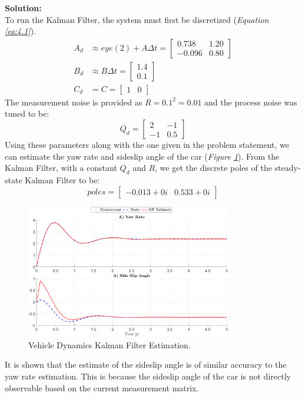 \documentclass[10pt]{article}
\newcommand{\solution}{\textbf{Solution: \\}}
\begin{document}
\begin{enumerate}[label=\textbf{\arabic*.}]
  \solution
  To run the Kalman Filter, the system must first be discretized 
  (\emph{Equation \ref{eq:4.1}}).
  \begin{equation}
    \begin{split}
      A_d &\approx eye(2) + A \Delta t = 
      \begin{bmatrix}
        0.738 & 1.20 \\ -0.096 & 0.80
      \end{bmatrix} \\
      B_d &\approx B \Delta t = 
      \begin{bmatrix}
        1.4 \\ 0.1
      \end{bmatrix} \\
      C_d &= C = 
      \begin{bmatrix}
        1 & 0
      \end{bmatrix}
    \end{split}
    \label{eq:4.1}
  \end{equation}
  The measurement noise is provided as $R=0.1^2=0.01$ and the process noise was 
  tuned to be:
  \begin{equation*}
    Q_d = \begin{bmatrix} 2 & -1 \\ -1 & 0.5 \end{bmatrix}
  \end{equation*}
  Using these parameters along with the one given in the problem statement, we 
  can estimate the yaw rate and sideslip angle of the car 
  (\emph{Figure \ref{f:4.1}}). From the Kalman Filter, with a constant 
  $Q_d$ and $R$, we get the discrete poles of the steady-state Kalman Filter to 
  be:
  \begin{equation*}
    poles = 
    \begin{bmatrix}
      -0.013 + 0i & 0.533 + 0i
    \end{bmatrix}
  \end{equation*}
  \begin{figure}[H]
    \centering
    \includegraphics[width=0.8\textwidth]{p4_a.png}
    \caption{Vehicle Dynamics Kalman Filter Estimation.}
    \label{f:4.1}
  \end{figure}
  It is shown that the estimate of the sideslip angle is of similar accuracy to 
  the yaw rate estimation. This is because the sideslip angle of the car is not 
  directly observable based on the current measurement matrix.


\end{enumerate}
\end{document}
